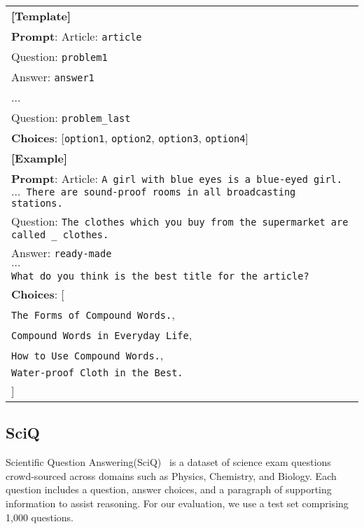 \begin{table}[H]
\centering
\begin{small}
\begin{tabular}{|p{7cm}|}
\hline
\textbf{[Template]} \\
\textbf{Prompt}: Article: \texttt{article} \\
Question: \texttt{problem1}\\
Answer: \texttt{answer1}\\
...\\
Question: \texttt{problem\_last}\\
\textbf{Choices}: [\texttt{option1}, \texttt{option2}, \texttt{option3}, \texttt{option4}] \\
\hline \textbf{[Example]} \\
\textbf{Prompt}: Article: \texttt{A girl with blue eyes is a blue-eyed girl. $\dots$ There are sound-proof rooms in all broadcasting stations.}\\Question: \texttt{The clothes which you buy from the supermarket are called \_ clothes.}\\Answer: \texttt{ready-made} \\$\dots$ \\ \texttt{What do you think is the best title for the article?} \\
\textbf{Choices}: [ \\
\hspace*{2em}\texttt{The Forms of Compound Words.}, \\
\hspace*{2em}\texttt{Compound Words in Everyday Life}, \\
\hspace*{2em}\texttt{How to Use Compound Words.}, \\
\hspace*{2em}\texttt{Water-proof Cloth in the Best.} \\
] \\ \hline
\end{tabular}
\end{small}
\end{table}

\subsection{SciQ}

Scientific Question Answering(SciQ)~\cite{welbl2017crowdsourcing} is a dataset of science exam questions crowd-sourced across domains such as Physics, Chemistry, and Biology. Each question includes a question, answer choices, and a paragraph of supporting information to assist reasoning. For our evaluation, we use a test set comprising 1,000 questions.

